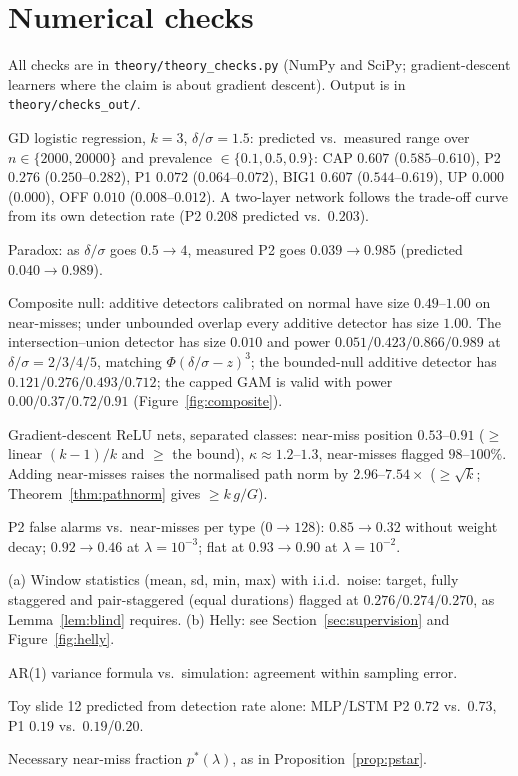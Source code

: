 \documentclass[11pt]{article}
\theoremstyle{definition}
\theoremstyle{remark}
\newcommand{\1}{\mathbf{1}}
\begin{document}
\section{Numerical checks}\label{sec:checks}
All checks are in \texttt{theory/theory\_checks.py} (NumPy and SciPy; gradient-descent learners where the claim is about gradient descent). Output is in \texttt{theory/checks\_out/}.
\begin{description}[leftmargin=1.2cm,style=nextline]
\item[C1] GD logistic regression, $k=3$, $\delta/\sigma=1.5$: predicted vs.\ measured range over $n\in\{2000,20000\}$ and prevalence $\in\{0.1,0.5,0.9\}$: CAP $0.607$ ($0.585$--$0.610$), P2 $0.276$ ($0.250$--$0.282$), P1 $0.072$ ($0.064$--$0.072$), BIG1 $0.607$ ($0.544$--$0.619$), UP $0.000$ ($0.000$), OFF $0.010$ ($0.008$--$0.012$). A two-layer network follows the trade-off curve from its own detection rate (P2 $0.208$ predicted vs.\ $0.203$).
\item[C2] Paradox: as $\delta/\sigma$ goes $0.5\to4$, measured P2 goes $0.039\to0.985$ (predicted $0.040\to0.989$).
\item[C3] Composite null: additive detectors calibrated on normal have size $0.49$--$1.00$ on near-misses; under unbounded overlap every additive detector has size $1.00$. The intersection--union detector has size $0.010$ and power $0.051/0.423/0.866/0.989$ at $\delta/\sigma=2/3/4/5$, matching $\Phi(\delta/\sigma-z)^3$; the bounded-null additive detector has $0.121/0.276/0.493/0.712$; the capped GAM is valid with power $0.00/0.37/0.72/0.91$ (Figure~\ref{fig:composite}).
\item[C4] Gradient-descent ReLU nets, separated classes: near-miss position $0.53$--$0.91$ ($\ge$ linear $(k-1)/k$ and $\ge$ the bound), $\kappa\approx1.2$--$1.3$, near-misses flagged $98$--$100\%$. Adding near-misses raises the normalised path norm by $2.96$--$7.54\times$ ($\ge\sqrt k$; Theorem~\ref{thm:pathnorm} gives $\ge k\,g/G$).
\item[C5] P2 false alarms vs.\ near-misses per type ($0\to128$): $0.85\to0.32$ without weight decay; $0.92\to0.46$ at $\lambda=10^{-3}$; flat at $0.93\to0.90$ at $\lambda=10^{-2}$.
\item[C6] (a) Window statistics (mean, sd, min, max) with i.i.d.\ noise: target, fully staggered and pair-staggered (equal durations) flagged at $0.276/0.274/0.270$, as Lemma~\ref{lem:blind} requires. (b) Helly: see Section~\ref{sec:supervision} and Figure~\ref{fig:helly}.
\item[C7] AR(1) variance formula vs.\ simulation: agreement within sampling error.
\item[C8] Toy slide 12 predicted from detection rate alone: MLP/LSTM P2 $0.72$ vs.\ $0.73$, P1 $0.19$ vs.\ $0.19$/$0.20$.
\item[C9] Necessary near-miss fraction $p^*(\lambda)$, as in Proposition~\ref{prop:pstar}.
\end{description}
\end{document}
